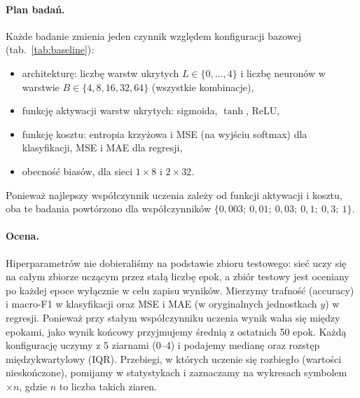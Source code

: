 \documentclass{article}
\begin{document}
\paragraph{Plan badań.} Każde badanie zmienia jeden czynnik względem konfiguracji bazowej
(tab.~\ref{tab:baseline}):
\begin{itemize}
  \item architekturę: liczbę warstw ukrytych $L \in \{0,\dots,4\}$ i liczbę neuronów w warstwie
  $B \in \{4, 8, 16, 32, 64\}$ (wszystkie kombinacje),
  \item funkcję aktywacji warstw ukrytych: sigmoida, $\tanh$, ReLU,
  \item funkcję kosztu: entropia krzyżowa i MSE (na wyjściu softmax) dla klasyfikacji, MSE i MAE
  dla regresji,
  \item obecność biasów, dla sieci $1\times8$ i $2\times32$.
\end{itemize}
Ponieważ najlepszy współczynnik uczenia zależy od funkcji aktywacji i kosztu, oba te badania
powtórzono dla współczynników $\{0{,}003;\ 0{,}01;\ 0{,}03;\ 0{,}1;\ 0{,}3;\ 1\}$.

\paragraph{Ocena.} Hiperparametrów nie dobieraliśmy na podstawie zbioru testowego: sieć uczy się na
całym zbiorze uczącym przez stałą liczbę epok, a zbiór testowy jest oceniany po każdej epoce
wyłącznie w celu zapisu wyników. Mierzymy trafność (accuracy) i macro-F1 w klasyfikacji oraz MSE
i MAE (w oryginalnych jednostkach $y$) w regresji. Ponieważ przy stałym współczynniku uczenia
wynik waha się między epokami, jako wynik końcowy przyjmujemy średnią z ostatnich 50 epok.
Każdą konfigurację uczymy z 5 ziarnami (0--4) i podajemy medianę oraz rozstęp międzykwartylowy (IQR).
Przebiegi, w których uczenie się rozbiegło (wartości nieskończone), pomijamy w statystykach
i zaznaczamy na wykresach symbolem $\times n$, gdzie $n$ to liczba takich ziaren.
\end{document}
